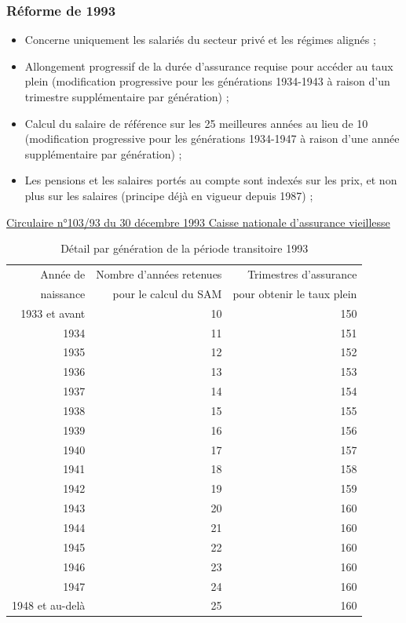 \subsubsection{Réforme de 1993}

\begin{itemize}
\item	Concerne uniquement les salariés du secteur privé et les régimes alignés ;
\item Allongement progressif de la durée d'assurance requise pour accéder au taux plein (modification progressive pour les générations 1934-1943 à raison d'un trimestre supplémentaire par génération) ;
\item	Calcul du salaire de référence sur les 25 meilleures années au lieu de 10 (modification progressive pour les générations 1934-1947 à raison d'une année supplémentaire par génération) ;
\item	Les pensions et les salaires portés au compte sont indexés sur les prix, et non plus sur les salaires (principe déjà en vigueur depuis 1987) ;
\end{itemize}
\href{http://www.legislation.cnav.fr/textes/cr/cn/TLR-CR_CN_10393_30121993.htm#323}%
{Circulaire n°103/93 du 30 décembre 1993 Caisse nationale d'assurance vieillesse}
\begin{table}[h]
  \centering
  \caption{Détail par génération de la période transitoire 1993}
    \begin{tabular}{rrr}
    \toprule
    Année de  & Nombre d'années retenues & Trimestres d'assurance  \\
    naissance & pour le calcul du SAM    & pour obtenir le taux plein \\
    \midrule
    1933 et avant & 10    & 150 \\
    1934  & 11    & 151 \\
    1935  & 12    & 152 \\
    1936  & 13    & 153 \\
    1937  & 14    & 154 \\
    1938  & 15    & 155 \\
    1939  & 16    & 156 \\
    1940  & 17    & 157 \\
    1941  & 18    & 158 \\
    1942  & 19    & 159 \\
    1943  & 20    & 160 \\
    1944  & 21    & 160 \\
    1945  & 22    & 160 \\
    1946  & 23    & 160 \\
    1947  & 24    & 160 \\
    1948 et au-delà & 25    & 160 \\
    \bottomrule
    \end{tabular}%
  \label{tab:addlabel}%
\end{table}%


